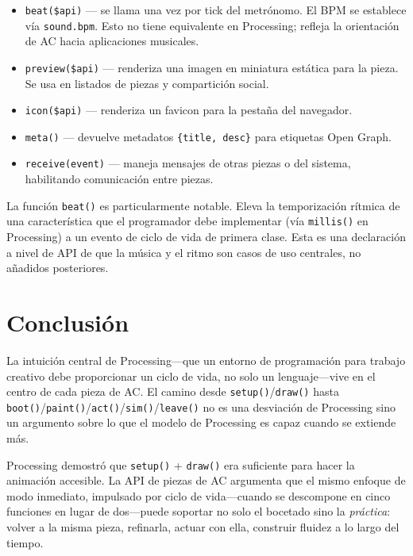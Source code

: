 \documentclass[10pt,letterpaper,twocolumn]{article}
\begin{document}
\begin{itemize}
  \item \texttt{beat(\$api)} --- se llama una vez por tick del metrónomo. El BPM se establece vía \texttt{sound.bpm}. Esto no tiene equivalente en Processing; refleja la orientación de AC hacia aplicaciones musicales.
  \item \texttt{preview(\$api)} --- renderiza una imagen en miniatura estática para la pieza. Se usa en listados de piezas y compartición social.
  \item \texttt{icon(\$api)} --- renderiza un favicon para la pestaña del navegador.
  \item \texttt{meta()} --- devuelve metadatos \texttt{\{title, desc\}} para etiquetas Open Graph.
  \item \texttt{receive(event)} --- maneja mensajes de otras piezas o del sistema, habilitando comunicación entre piezas.
\end{itemize}

La función \texttt{beat()} es particularmente notable. Eleva la temporización rítmica de una característica que el programador debe implementar (vía \texttt{millis()} en Processing) a un evento de ciclo de vida de primera clase. Esta es una declaración a nivel de API de que la música y el ritmo son casos de uso centrales, no añadidos posteriores.


\section{Conclusión}
\label{sec:conclusion}

La intuición central de Processing---que un entorno de programación para trabajo creativo debe proporcionar un ciclo de vida, no solo un lenguaje---vive en el centro de cada pieza de AC. El camino desde \texttt{setup()}/\texttt{draw()} hasta \texttt{boot()}/\texttt{paint()}/\texttt{act()}/\texttt{sim()}/\texttt{leave()} no es una desviación de Processing sino un argumento sobre lo que el modelo de Processing es capaz cuando se extiende más.

Processing demostró que \texttt{setup()} + \texttt{draw()} era suficiente para hacer la animación accesible. La API de piezas de AC argumenta que el mismo enfoque de modo inmediato, impulsado por ciclo de vida---cuando se descompone en cinco funciones en lugar de dos---puede soportar no solo el bocetado sino la \emph{práctica}: volver a la misma pieza, refinarla, actuar con ella, construir fluidez a lo largo del tiempo.
\end{document}
